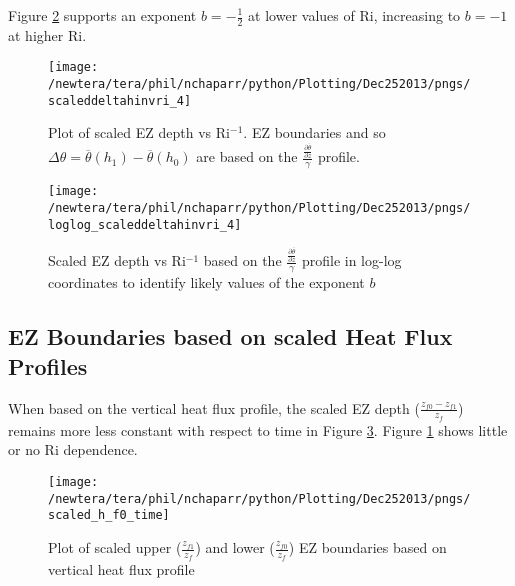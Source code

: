 Figure \ref{fig:loglogdeltahinvri} supports an exponent $b = -\frac{1}{2}$ at lower values of \acs{Ri}, increasing to $b = -1$ at higher \acs{Ri}.    

\clearpage

\begin{figure}[t]
    \centering
    \texttt{[image: /newtera/tera/phil/nchaparr/python/Plotting/Dec252013/pngs/scaleddeltahinvri\_4]}
    \caption[Scaled \acs{EZ} Depth vs \acs{Ri}$^{-1}$]{Plot of scaled \acs{EZ} depth vs \acs{Ri}$^{-1}$. \acs{EZ} boundaries and so $\Delta \theta = \overline{\theta}(h_{1}) - \overline{\theta}(h_{0})$ are based on the $\frac{\frac{\partial \overline{\theta}}{\partial z}}{\gamma}$ profile.}
    \label{fig:deltahinvri_scaled}   %
\end{figure}                      
\vspace{-50mm}
\begin{figure}[b]
\centering
\texttt{[image: /newtera/tera/phil/nchaparr/python/Plotting/Dec252013/pngs/loglog\_scaleddeltahinvri\_4]}\\
\caption[Log-log Plot of scaled \acs{EZ} Depth vs \acs{Ri}$^{-1}$]{Scaled \acs{EZ} depth vs \acs{Ri}$^{-1}$ based on the $\frac{\frac{\partial \overline{\theta}}{\partial z}}{\gamma}$ profile in log-log coordinates to identify likely values of the exponent $b$}
\label{fig:loglogdeltahinvri}
\end{figure}

\clearpage

\subsection{\acs{EZ} Boundaries based on scaled Heat Flux Profiles}
\label{susec:fluxbound}
When based on the vertical heat flux profile, the scaled \acs{EZ} depth ($\frac{z_{f0}-z_{f1}}{z_{f}}$) remains more less constant with respect to time in Figure \ref{fig:scaledEZlims1}. Figure \ref{fig:deltahinvri_scaled} shows little or no \acs{Ri} dependence. 

\begin{figure}[htbp]
    \centering
\texttt{[image: /newtera/tera/phil/nchaparr/python/Plotting/Dec252013/pngs/scaled\_h\_f0\_time]}              
\caption[Scaled \acs{EZ} Boundaries based on the vertical Heat Flux Profile]{Plot of scaled upper ($\frac{z_{f1}}{z_{f}}$) and lower ($\frac{z_{f0}}{z_{f}}$) \acs{EZ} boundaries based on vertical heat flux profile}
    \label{fig:scaledEZlims1}   %
\end{figure}

